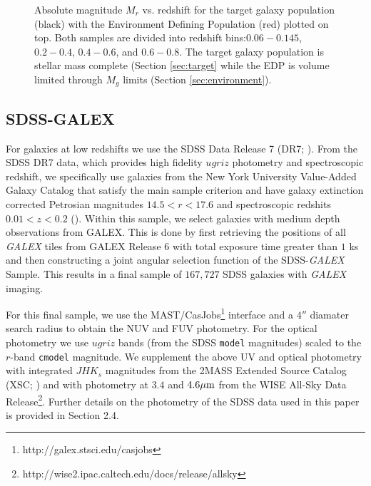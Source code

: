 \documentclass{emulateapj}
\begin{document}
\begin{figure*}
    \begin{center}
        \leavevmode
        \label{fig:targetEDP}
        \caption{Absolute magnitude $M_{r}$ vs. redshift for the target galaxy population (black) with the Environment Defining Population (red) plotted on top. Both samples are divided into redshift bins:$0.06-0.145$, $0.2-0.4$, $0.4-0.6$, and $0.6-0.8$. The target galaxy population is stellar mass complete (Section \ref{sec:target} while the EDP is volume limited through $M_{g}$ limits (Section \ref{sec:environment}).}
    \end{center}
\end{figure*}

\subsection{SDSS-GALEX} \label{sec:sdss}
For galaxies at low redshifts we use the SDSS Data Release 7 (DR7; \cite{Abazajian:2009aa}). 
From the SDSS DR7 data, which provides high fidelity $ugriz$ photometry and spectroscopic redshift, we specifically use galaxies from the New York University 
Value-Added Galaxy Catalog that satisfy the main sample criterion and have galaxy extinction corrected Petrosian magnitudes $14.5 < r < 17.6$ 
and spectroscopic redshits $0.01<z<0.2$ (\cite{Blanton:2005aa}). 
Within this sample, we select galaxies with medium depth observations from GALEX. 
This is done by first retrieving the positions of all {\em GALEX} tiles from GALEX Release 6 with total exposure time greater than $1$ ks and then constructing 
a joint angular selection function of the SDSS-{\em GALEX} Sample. 
This results in a final sample of $167,727$ SDSS galaxies with {\em GALEX} imaging. 

For this final sample, we use the MAST/CasJobs\footnote{http://galex.stsci.edu/casjobs} interface and a $4''$ diamater search radius to obtain the NUV and FUV photometry. 
For the optical photometry we use $ugriz$ bands (from the SDSS \texttt{model} magnitudes) scaled to the $r$-band \texttt{cmodel} magnitude. 
We supplement the above UV and optical photometry with integrated $JHK_s$ magnitudes from the 2MASS Extended Source Catalog (XSC; \cite{Jarrett:2000aa}) and with photometry at $3.4$ 
and $4.6 \mu \rm{m}$ from the WISE All-Sky Data Release\footnote{http://wise2.ipac.caltech.edu/docs/release/allsky}. 
Further details on the photometry of the SDSS data used in this paper is provided in \cite{Moustakas:2013aa} Section 2.4. 
\end{document}
